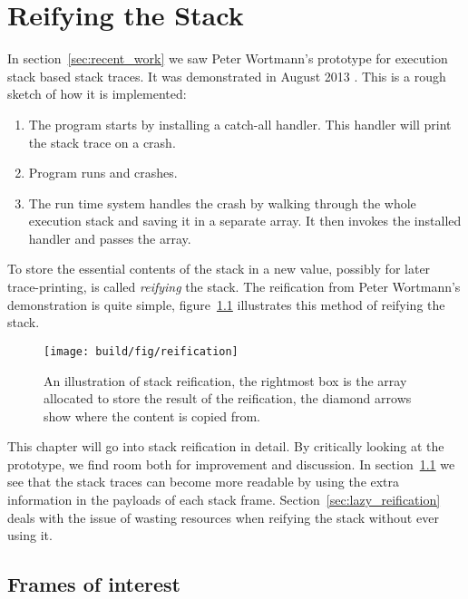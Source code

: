 \chapter{Reifying the Stack} \label{chp:reifying_the_stack}

In section~\ref{sec:recent_work} we saw Peter Wortmann's prototype for
execution stack based stack traces. It was demonstrated in August
2013 \cite{stack_traces_ticket}. This is a rough sketch of how it is
implemented:

\begin{enumerate}
  \item
    The program starts by installing a catch-all handler. This handler will
    print the stack trace on a crash.
  \item
    Program runs and crashes.
  \item
    The run time system handles the crash by walking through the whole
    execution stack and saving it in a separate array. It then invokes the
    installed handler and passes the array.
\end{enumerate}

To store the essential contents of the stack in a new value,
possibly for later trace-printing, is called \emph{reifying} the
stack. The reification from Peter Wortmann's demonstration is
quite simple, figure~\ref{fig:reification} illustrates
this method of reifying the stack.

\begin{figure}
\begin{mdframed}
  \texttt{[image: build/fig/reification]}
  \caption{An illustration of stack reification, the rightmost box
  is the array allocated to store the result of the reification, the
  diamond arrows show where the content is copied from.}
  \label{fig:reification}
\end{mdframed}
\end{figure}

This chapter will go into
stack reification in detail. By critically looking
at the prototype, we find room both for improvement and discussion.
In section~\ref{sec:frames_of_interest} we see that the stack traces can become more
readable by using the extra information in the payloads of each stack
frame. Section~\ref{sec:lazy_reification} deals with the issue of wasting
resources when reifying the stack without ever using it.

\section{Frames of interest} \label{sec:frames_of_interest}

